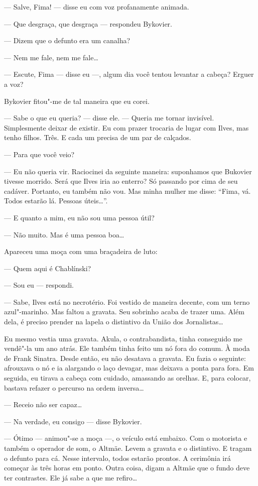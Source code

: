 --- Salve, Fima! --- disse eu com voz profanamente animada.

--- Que desgraça, que desgraça --- respondeu Bykovier.

--- Dizem que o defunto era um canalha?

--- Nem me fale, nem me fale\ldots{}

--- Escute, Fima --- disse eu ---, algum dia você tentou levantar a
cabeça? Erguer a voz?

Bykovier fitou"-me de tal maneira que eu corei.

--- Sabe o que eu queria? --- disse ele. --- Queria me tornar invisível.
Simplesmente deixar de existir. Eu com prazer trocaria de lugar com
Ilves, mas tenho filhos. Três. E cada um precisa de um par de calçados.

--- Para que você veio?

--- Eu não queria vir. Raciocinei da seguinte maneira: suponhamos que
Bukovier tivesse morrido. Será que Ilves iria ao enterro? Só passando
por cima de seu cadáver. Portanto, eu também não vou. Mas minha mulher
me disse: ``Fima, vá. Todos estarão lá. Pessoas úteis\ldots{}''.

--- E quanto a mim, eu não sou uma pessoa útil?

--- Não muito. Mas é uma pessoa boa\ldots{}

Apareceu uma moça com uma braçadeira de luto:

--- Quem aqui é Chablínski?

--- Sou eu --- respondi.

--- Sabe, Ilves está no necrotério. Foi vestido de maneira decente, com
um terno azul"-marinho. Mas faltou a gravata. Seu sobrinho acaba de
trazer uma. Além dela, é preciso prender na lapela o distintivo da União
dos Jornalistas\ldots{}

Eu mesmo vestia uma gravata. Akula, o contrabandista, tinha conseguido
me vendê"-la um ano atrás. Ele também tinha feito um nó fora do comum. À
moda de Frank Sinatra. Desde então, eu não desatava a gravata. Eu fazia
o seguinte: afrouxava o nó e ia alargando o laço devagar, mas deixava a
ponta para fora. Em seguida, eu tirava a cabeça com cuidado, amassando
as orelhas. E, para colocar, bastava refazer o percurso na ordem
inversa\ldots{}

--- Receio não ser capaz\ldots{}

--- Na verdade, eu consigo --- disse Bykovier.

--- Ótimo --- animou"-se a moça ---, o veículo está embaixo. Com o
motorista e também o operador de som, o Altmäe. Levem a gravata e o
distintivo. E tragam o defunto para cá. Nesse intervalo, todos estarão
prontos. A cerimônia irá começar às três horas em ponto. Outra coisa,
digam a Altmäe que o fundo deve ter contrastes. Ele já sabe a que me
refiro\ldots{}

